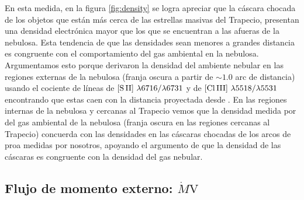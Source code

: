 En esta medida, en la figura \ref{fig:density} se logra apreciar que la cáscara chocada de los objetos que están más cerca de las estrellas masivas del Trapecio, presentan una densidad electrónica mayor que los que se encuentran a las afueras de la nebulosa. Esta tendencia de que las densidades sean menores a grandes distancia es congruente con el comportamiento del gas ambiental en la nebulosa. Argumentamos esto porque \citet{Odell:2010} derivaron la densidad del ambiente nebular en las regiones externas de la nebulosa (franja oscura a partir de \(\sim 1.0\) arc de distancia) usando el cociente de líneas de \(\mathrm{[S\,II]}~\lambda 6716/\lambda 6731\) y de \(\mathrm{[Cl\,III]}~\lambda 5518/\lambda 5531\) encontrando que estas caen con la distancia proyectada desde \thC{}. En las regiones internas de la nebulosa y cercanas al Trapecio vemos que la densidad medida por \citet{Mesa:2008} del gas ambiental de la nebulosa (franja oscura en las regiones cercanas  al Trapecio) concuerda con las densidades en las cáscaras chocadas de los arcos de proa medidas por nosotros, apoyando el argumento de que la densidad de las cáscaras es congruente con la densidad del gas nebular.    

\subsection{Flujo de momento externo: \(\dot{M}\text{V}\) }
\label{sec:pressure}


